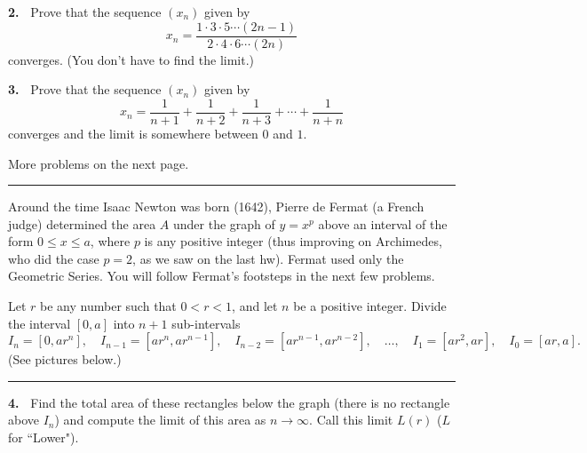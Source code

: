 \documentclass[12pt]{article}
\theoremstyle{definition}
\theoremstyle{remark}
\theoremstyle{definition}
\newenvironment{Solution}{\noindent\textbf{Solution.}}{}
\begin{document}
\vskip10pt

{\bf 2.\ } Prove that the sequence $(x_n)$ given by
\[x_n=\frac{1\cdot 3\cdot 5\cdots (2n-1)}{2\cdot 4\cdot 6\cdots (2n)}\]
converges. (You don't have to find the limit.) 


{\bf 3.\ } Prove that the sequence $(x_n)$ given by
\[x_n=\frac{1}{n+1}+\frac{1}{n+2}+\frac{1}{n+3}+\cdots+\frac{1}{n+n}\]
converges and the limit is somewhere between $0$ and $1$. 

More problems on the next page. 
\newpage
\rule{\textwidth}{1pt}
Around the time Isaac Newton was born (1642), Pierre de Fermat (a French judge) determined the area $A$ under the graph of $y=x^p$ above an interval of the form $0\leq x\leq a$, where $p$ is any positive integer (thus improving on Archimedes, who did the case $p=2$, as we saw on the last hw).  Fermat used only the Geometric Series. You will follow Fermat's footsteps in the next few problems. 

Let $r$ be any number such that $0<r<1$, and let $n$ be a positive integer.   
Divide the interval $[0,a]$ into $n+1$ sub-intervals 
\[I_n=[0,ar^n],\quad I_{n-1}=[ar^n,ar^{n-1}],\quad I_{n-2}=[ar^{n-1}, ar^{n-2}],\quad \dots,\quad  I_1=[ar^2,ar],\quad I_0=[ar,a].\]
(See pictures below.)

\rule{\textwidth}{1pt}

{\bf 4.\ } Find the total area of these rectangles below the graph (there is no rectangle above $I_n$) and compute the limit of this area as $n\to\infty$.  Call this limit $L(r)$ ($L$ for ``Lower"). 
\end{document}
